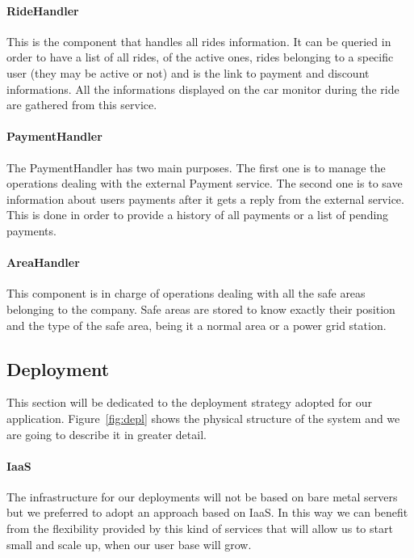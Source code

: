 \paragraph{RideHandler}
This is the component that handles all rides information. It can be queried in order to have
a list of all rides, of the active ones, rides belonging to a specific user
(they may be active or not) and is the link to payment and discount informations. All the informations
displayed on the car monitor during the ride are gathered from this service.

\paragraph{PaymentHandler}
The PaymentHandler has two main purposes. The first one is to manage the operations dealing
with the external Payment service. The second one is to save information about users payments
after it gets a reply from the external service. 
This is done in order to provide a history of all payments or a list of pending payments.


\paragraph{AreaHandler}
This component is in charge of operations dealing with all the safe areas belonging to the company.
Safe areas are stored to know exactly their position and the type of the safe area, being it
a normal area or a power grid station.

\pagebreak

\subsection{Deployment}
This section will be dedicated to the deployment strategy adopted for our application. Figure~\ref{fig:depl}
shows the physical structure of the system and we are going to describe it in greater detail.

\paragraph{IaaS} The infrastructure for our deployments will not be based on bare metal servers
but we preferred to adopt an approach based on IaaS. In this way we can benefit from the
flexibility provided by this kind of services that will allow us to start small and scale
up, when our user base will grow.  

